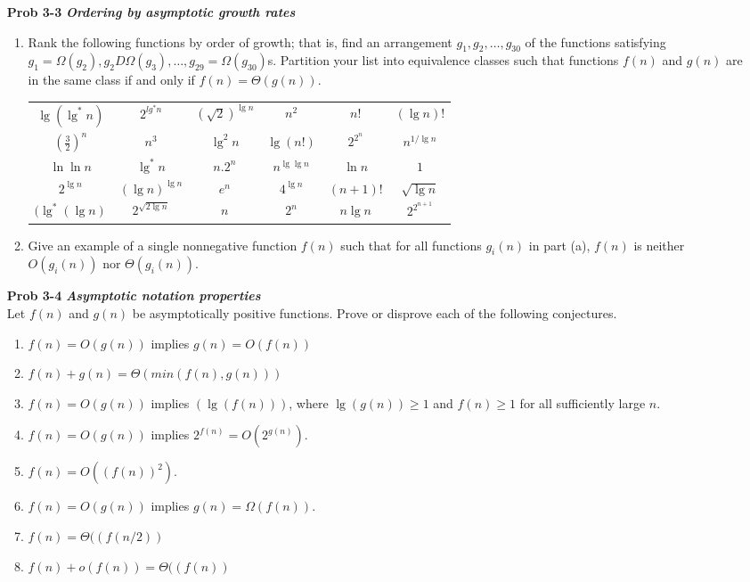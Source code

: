 \documentclass[fontsize=12pt,paper=a4]{book}
\begin{document}
\begin{enumerate}
 \item[\textbf{Prob 3-3}]
       \textbf{\textit{Ordering by asymptotic growth rates}}
       \begin{enumerate}
        \item Rank the following functions by order of growth; that is, find an arrangement $g_1, g_2, \dots , g_30$ of the functions satisfying $g_1 = \Omega (g_2), g_2 D \Omega (g_3), \dots,g_29 = \Omega (g_30)$s. Partition your list into equivalence classes such that functions $f(n)$ and $g(n)$ are in the same class if and only if $f(n) = \Theta(g(n))$.
              \begin{tabular}{c c c c c c}
               $\lg(\lg^* n)$    & $2^{lg^* n}$         & $(\sqrt{2})^{\lg n}$ & $n^2$           & $n!$      & $(\lg n)!$     \\
               $(\frac{3}{2})^n$ & $n^3$                & $\lg^2 n$            & $\lg(n!)$       & $2^{2^n}$ & $n^{1/\lg n}$  \\
               $\ln \ln n$       & $\lg^* n$            & $n . 2^n$            & $n^{\lg \lg n}$ & $\ln n$   & $1$            \\
               $2^{\lg n}$       & $(\lg n)^{\lg n}$    & $e^n$                & $4^{\lg n}$     & $(n+1)!$  & $\sqrt{\lg n}$ \\
               $(\lg^*(\lg n)$   & $2^{\sqrt{2 \lg n}}$ & $n$                  & $2^n$           & $n \lg n$ & $2^{2^{n+1}}$  \\
              \end{tabular}
        \item Give an example of a single nonnegative function $f(n)$ such that for all functions $g_i(n)$ in part (a), $f(n)$ is neither $O(g_i(n))$ nor $\Theta(g_i(n))$.
       \end{enumerate}
       
 \item[\textbf{Prob 3-4}]
       \textbf{\textit{Asymptotic notation properties}}\\
       Let $f(n)$ and $g(n)$ be asymptotically positive functions. Prove or disprove each of the following conjectures.
       \begin{enumerate}
        \item $f(n) = O(g(n))$ implies $g(n) = O(f(n))$
        \item $f(n) + g(n) = \Theta(min(f(n), g(n)))$
        \item $f(n) = O(g(n))$ implies $(\lg(f(n)))$, where $\lg(g(n)) \geq 1$ and $f(n) \geq 1$ for all sufficiently large $n$.
        \item $f(n) = O(g(n))$ implies $2^{f(n)} = O(2^{g(n)})$.
        \item $f(n) = O((f(n))^2)$.
        \item $f(n) = O(g(n))$ implies $g(n) = \Omega(f(n))$.
        \item $f(n) = \Theta((f(n/2))$
        \item $f(n) + o(f(n)) = \Theta((f(n))$
       \end{enumerate}
       

\end{enumerate}
\end{document}
